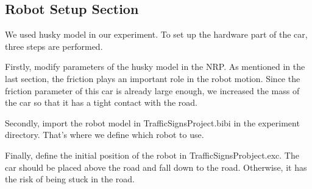 \subsection{Robot Setup Section}

We used husky model in our experiment. To set up the hardware part of the car, three steps are performed.


Firstly, modify parameters of the husky model in the NRP. As mentioned in the last section, the friction plays an important role in the robot motion. Since the friction parameter of this car is already large enough, we increased the mass of the car so that it has a tight contact with the road.


Secondly, import the robot model in TrafficSignsProject.bibi in the experiment directory. That's where we define which robot to use.


Finally, define the initial position of the robot in TrafficSignsProbject.exc. The car should be placed above the road and fall down to the road. Otherwise, it has the risk of being stuck in the road.



